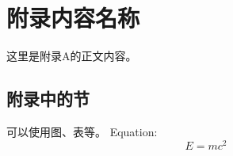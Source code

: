 
\chapter{附录内容名称} %
\label{app:example}

这里是附录A的正文内容。

\section{附录中的节}
可以使用图、表等。 Equation:
\begin{equation}
    E = mc^2
\end{equation}